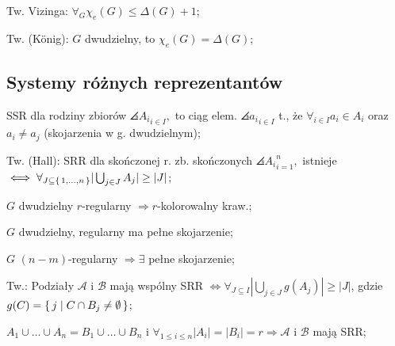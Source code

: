 Tw. Vizinga: $\forall_G \chi_e(G) \leq \Delta(G) +1$;

Tw. (K{\"o}nig): $G$ dwudzielny, to $\chi_e(G) = \Delta(G)$;

\subsection{Systemy różnych reprezentantów}

SSR dla rodziny zbiorów $\angles{A_i}_{i\in I},$ to ciąg elem.
  $\angles{a_i}_{i\in I}$ t., że
  $\forall_{i\in I} a_i \in A_i$ oraz $a_i \neq a_j$
  (skojarzenia w g. dwudzielnym);

Tw. (Hall): SRR dla skończonej r. zb. skończonych $\angles{A_i}_{i=1}^n,$
  istnieje
  $\iff \forall_{J\subseteq\set{1,\dots,n}} |\bigcup_{j\in J}A_j| \geq |J|$;

$G$ dwudzielny $r$-regularny $\Rightarrow r$-kolorowalny kraw.;

$G$ dwudzielny, regularny ma pełne skojarzenie;

$G$ $(n-m)$-regularny $\Rightarrow \exists$ pełne skojarzenie;

Tw.: Podziały $\mathcal{A}$ i $\mathcal{B}$ mają wspólny SRR $\Leftrightarrow
  \forall_{J\subseteq I} |\bigcup_{j\in J}g(A_j)| \geq |J|$, gdzie
  $g(C) = \set{j | C \cap B_j \neq \emptyset}$;

$A_1 \cup \dots \cup A_n = B_1 \cup \dots \cup B_n$ i
  $\forall_{1 \leq i \leq n}|A_i| = |B_i| =r \Rightarrow \mathcal{A}$ i
  $\mathcal{B}$ mają SRR;
